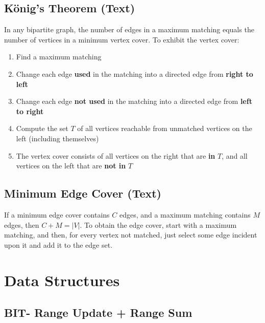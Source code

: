 \documentclass[12pt]{extarticle}
\begin{document}
\begin{multicols*}{2}
\subsection{K\"onig's Theorem (Text)} %
In any bipartite graph, the number of edges in a maximum matching equals the
number of vertices in a minimum vertex cover. To exhibit the vertex cover:
\begin{enumerate}
\item Find a maximum matching
\item Change each edge \textbf{used} in the matching into a directed edge from
\textbf{right to left}
\item Change each edge \textbf{not used} in the matching into a directed edge
from \textbf{left to right}
\item Compute the set $T$ of all vertices reachable from unmatched vertices on
the left (including themselves)
\item The vertex cover consists of all vertices on the right that are
\textbf{in} $T$, and all vertices on the left that are \textbf{not in} $T$
\end{enumerate}

\subsection{Minimum Edge Cover (Text)} %
If a minimum edge cover contains $C$ edges, and a maximum matching contains $M$
edges, then $C + M = |V|$. To obtain the edge cover, start with a maximum
matching, and then, for every vertex not matched, just select some edge
incident upon it and add it to the edge set. 


\section{Data Structures}

% 

% 

\subsection{BIT- Range Update + Range Sum} %



\end{multicols*}
\end{document}

